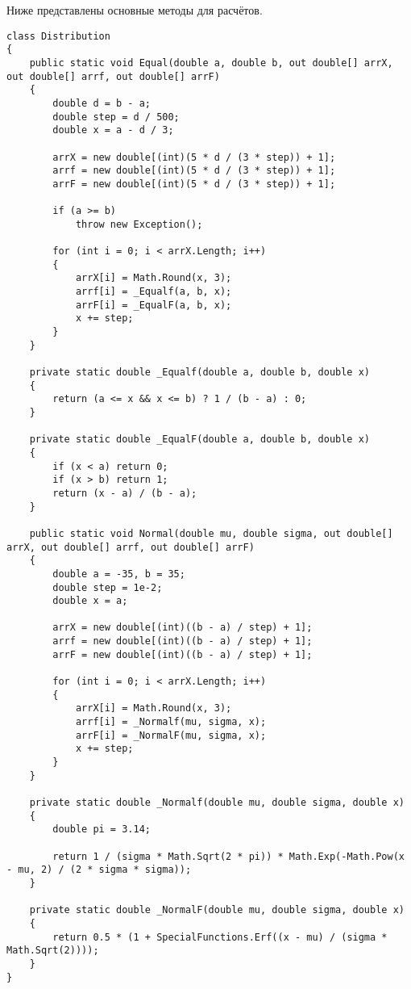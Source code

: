 Ниже представлены основные методы для расчётов.

\begin{lstlisting}
class Distribution
{
	public static void Equal(double a, double b, out double[] arrX, out double[] arrf, out double[] arrF)
	{
		double d = b - a;
		double step = d / 500;
		double x = a - d / 3;
		
		arrX = new double[(int)(5 * d / (3 * step)) + 1];
		arrf = new double[(int)(5 * d / (3 * step)) + 1];
		arrF = new double[(int)(5 * d / (3 * step)) + 1];
		
		if (a >= b)
			throw new Exception();
		
		for (int i = 0; i < arrX.Length; i++)
		{
			arrX[i] = Math.Round(x, 3);
			arrf[i] = _Equalf(a, b, x);
			arrF[i] = _EqualF(a, b, x);
			x += step;
		}
	}
	
	private static double _Equalf(double a, double b, double x)
	{
		return (a <= x && x <= b) ? 1 / (b - a) : 0;
	}
	
	private static double _EqualF(double a, double b, double x)
	{
		if (x < a) return 0;
		if (x > b) return 1;
		return (x - a) / (b - a);
	}
	
	public static void Normal(double mu, double sigma, out double[] arrX, out double[] arrf, out double[] arrF)
	{
		double a = -35, b = 35;
		double step = 1e-2;
		double x = a;
		
		arrX = new double[(int)((b - a) / step) + 1];
		arrf = new double[(int)((b - a) / step) + 1];
		arrF = new double[(int)((b - a) / step) + 1];
		
		for (int i = 0; i < arrX.Length; i++)
		{
			arrX[i] = Math.Round(x, 3);
			arrf[i] = _Normalf(mu, sigma, x);
			arrF[i] = _NormalF(mu, sigma, x);
			x += step;
		}
	}
	
	private static double _Normalf(double mu, double sigma, double x)
	{
		double pi = 3.14;
		
		return 1 / (sigma * Math.Sqrt(2 * pi)) * Math.Exp(-Math.Pow(x - mu, 2) / (2 * sigma * sigma));
	}
	
	private static double _NormalF(double mu, double sigma, double x)
	{
		return 0.5 * (1 + SpecialFunctions.Erf((x - mu) / (sigma * Math.Sqrt(2))));
	}
}
\end{lstlisting}